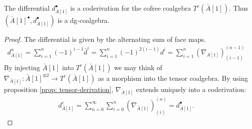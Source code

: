 \documentclass[../thesis.tex]{subfiles}
\begin{document}
            \begin{corollary}\label{cor: a-to-dgc}
                The differential $d_{\bar{A}[1]}^\bullet$ is a coderivation for the cofree coalgebra $T^c(\bar{A}[1])$. Thus $(\bar{A}[1]^\bullet, d_{\bar{A}[1]}^\bullet)$ is a dg-coalgebra.
            \end{corollary}

            \begin{proof}
                The differential is given by the alternating sum of face maps.
                \begin{align*}
                    d_{\bar{A}[1]}^n = \sum_{i=1}^n (-1)^{i-1}\bar{d}^i = \sum_{i=1}^n (-1)^{2(i-1)}d^i = \sum_{i=1}^n (\nabla_{A[1]})_{(i-1)}^{(n-1)}
                \end{align*}
                By injecting $\bar{A}[1]$ into $T^c(\bar{A}[1])$ we may think of $\nabla_{\bar{A}[1]} : \bar{A}[1]^{\otimes 2} \rightarrow T^c(\bar{A}[1])$ as a morphism into the tensor coalgebra. By using proposition \ref{prop: tensor-derivation}, $\nabla_{\bar{A}[1]}$ extends uniquely into a coderivation:
                \begin{align*}
                    d_{\bar{A}[1]}^c = \sum_{n=0}^{\infty}\sum_{i=0}^n(\nabla_{\bar{A}[1]})_{(i)}^{(n)} = d_{\bar{A}[1]}^\bullet\text{.}
                \end{align*}
            \end{proof}
\end{document}
